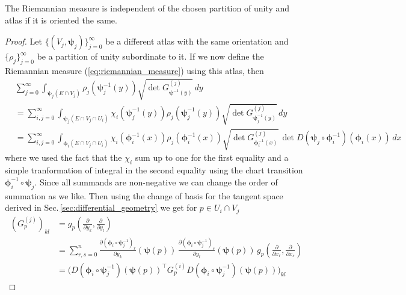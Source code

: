 \documentclass[../main.tex]{subfiles}
\begin{document}
\begin{proposition}
    The Riemannian measure is independent of the chosen partition of unity and atlas if it is 
    oriented the same.
\end{proposition}
\begin{proof}
    Let $\{(V_j, \boldsymbol{\psi}_j)\}_{j=0}^\infty$ 
    be a different atlas with the same orientation and 
    $\{\rho_j\}_{j=0}^\infty$ be a partition of unity subordinate to it. If we now 
    define the Riemannian measure (\ref{eq:riemannian_measure}) using this atlas, then
    \begin{align}
        &\sum_{j=0}^\infty \int_{\boldsymbol{\psi}_j(E\cap V_j)} \rho_j(\boldsymbol{\psi}_j^{-1}(y))
            \sqrt{\det G^{(j)}_{\boldsymbol{\psi}^{-1}(y)}} \, dy \nonumber
        \\ &= \sum_{i,j=0}^\infty \int_{\boldsymbol{\psi}_j(E\cap V_j \cap U_i)} \chi_i(\boldsymbol{\psi}_j^{-1}(y)) \rho_j(\boldsymbol{\psi}_j^{-1}(y))
            \sqrt{\det G^{(j)}_{\boldsymbol{\psi}_j^{-1}(y)}} \, dy \nonumber
        \\ &= \sum_{i,j=0}^\infty \int_{\boldsymbol{\phi}_i(E\cap V_j \cap U_i)} \chi_i(\boldsymbol{\phi}_i^{-1}(x)) \rho_j(\boldsymbol{\phi}_i^{-1}(x))
            \sqrt{\det G^{(j)}_{\boldsymbol{\phi}_i^{-1}(x)}} \, \det D(\boldsymbol{\psi}_j \circ \boldsymbol{\phi}^{-1}_i)(\boldsymbol{\phi}_i(x)) \, dx \label{eq:double_sum_riemannian_measure}
    \end{align}
    where we used the fact that the $\chi_i$ sum up to one for the first 
    equality and a simple tranformation of integral in the second equality
    using the chart transition $\boldsymbol{\phi}_i^{-1}\circ \boldsymbol{\psi}_j$. Since all summands 
    are non-negative we can change the order of summation as we like. Then using the 
    change of basis for the tangent space derived in Sec.\,\ref{sec:differential_geometry}
    we get for $p \in U_i \cap V_j$
    \begin{align*}
        (G^{(j)}_p)_{kl} &= g_p(\frac{\partial}{\partial y_k}, \frac{\partial}{\partial y_l})
        \\ &= \sum_{r,s=0}^n \frac{\partial(\boldsymbol{\phi}_i \circ \boldsymbol{\psi}_j^{-1})_r}{\partial y_k}(\boldsymbol{\psi}(p))
            \, \frac{\partial(\boldsymbol{\phi}_i \circ \boldsymbol{\psi}_j^{-1})_s}{\partial y_l}(\boldsymbol{\psi}(p))
            \, g_p(\frac{\partial}{\partial x_r}, \frac{\partial}{\partial x_s})
        \\ &= \bigg( D(\boldsymbol{\phi}_i \circ \boldsymbol{\psi}_j^{-1})(\boldsymbol{\psi}(p))^\top G^{(i)}_p D(\boldsymbol{\phi}_i \circ \boldsymbol{\psi}_j^{-1})(\boldsymbol{\psi}(p))\bigg)_{kl}

\end{align*}
\end{proof}
\end{document}
